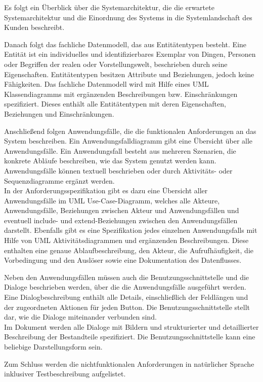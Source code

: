Es folgt ein Überblick über die Systemarchitektur, die die erwartete Systemarchitektur und die Einordnung des Systems 
in die Systemlandschaft des Kunden beschreibt.

Danach folgt das fachliche Datenmodell, das aus Entitätentypen besteht. Eine Entität ist ein individuelles 
und identifizierbares Exemplar von Dingen, Personen oder Begriffen der realen oder Vorstellungswelt, beschrieben 
durch seine Eigenschaften. Entitätentypen besitzen Attribute und Beziehungen, jedoch keine Fähigkeiten. Das fachliche 
Datenmodell wird mit Hilfe eines UML Klassendiagramms mit ergänzenden Beschreibungen bzw. Einschränkungen spezifiziert.
Dieses enthält alle Entitätentypen mit deren Eigenschaften, Beziehungen und Einschränkungen.

Anschließend folgen Anwendungsfälle, die die funktionalen Anforderungen an das System beschreiben. 
Ein Anwendungsfalldiagramm gibt eine Übersicht über alle Anwendungsfälle. Ein Anwendungsfall besteht aus mehreren 
Szenarien, die konkrete Abläufe beschreiben, wie das System genutzt werden kann. Anwendungsfälle können textuell 
beschrieben oder durch Aktivitäts- oder Sequenzdiagramme ergänzt werden.\\
In der Anforderungsspezifikation gibt es dazu eine Übersicht aller Anwendungsfälle im UML Use-Case-Diagramm, welches 
alle Akteure, Anwendungsfälle, Beziehungen zwischen Akteur und Anwendungsfällen und eventuell include- und extend-Beziehungen
zwischen den Anwendungsfällen darstellt. Ebenfalls gibt es eine Spezifikation jedes einzelnen Anwendungsfalls mit Hilfe 
von UML Aktivitätsdiagrammen und ergänzenden Beschreibungen. Diese enthalten eine genaue Ablaufbeschreibung, den Akteur, 
die Aufrufhäufigkeit, die Vorbedingung und den Auslöser sowie eine Dokumentation des Datenflusses. 

Neben den Anwendungsfällen müssen auch die Benutzungsschnittstelle und die Dialoge beschrieben werden, über die die Anwendungsfälle 
ausgeführt werden. Eine Dialogbeschreibung enthält alle Details, einschließlich der Feldlängen und der zugeordneten 
Aktionen für jeden Button. Die Benutzungsschnittstelle stellt dar, wie die Dialoge miteinander verbunden sind.\\
Im Dokument werden alle Dialoge mit Bildern und strukturierter und detaillierter Beschreibung der Bestandteile spezifiziert.
Die Benutzungsschnittstelle kann eine beliebige Darstellungsform sein.

Zum Schluss werden die nichtfunktionalen Anforderungen in natürlicher Sprache inklusiver Testbeschreibung aufgelistet.


